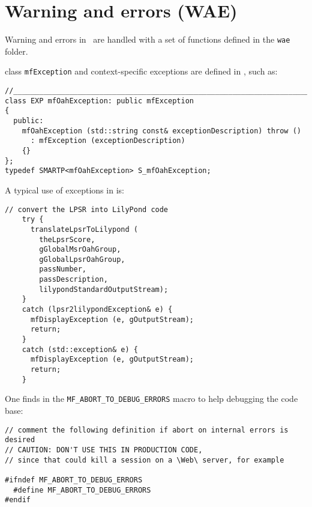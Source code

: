 
\chapter{Warning and errors (WAE)}


Warning and errors in \mf\ are handled with a set of functions defined in the {\tt wae} folder.

class   {\tt mfException} and context-specific exceptions are defined in , such as:
\begin{lstlisting}[language=CPlusPlus]
//______________________________________________________________________________
class EXP mfOahException: public mfException
{
  public:
    mfOahException (std::string const& exceptionDescription) throw ()
      : mfException (exceptionDescription)
    {}
};
typedef SMARTP<mfOahException> S_mfOahException;
\end{lstlisting}

A typical use of exceptions in  is:
\begin{lstlisting}[language=CPlusPlus]
    // convert the LPSR into LilyPond code
    try {
      translateLpsrToLilypond (
        theLpsrScore,
        gGlobalMsrOahGroup,
        gGlobalLpsrOahGroup,
        passNumber,
        passDescription,
        lilypondStandardOutputStream);
    }
    catch (lpsr2lilypondException& e) {
      mfDisplayException (e, gOutputStream);
      return;
    }
    catch (std::exception& e) {
      mfDisplayException (e, gOutputStream);
      return;
    }
\end{lstlisting}


One finds in  the {\tt MF_ABORT_TO_DEBUG_ERRORS} macro to help debugging the code base:
\begin{lstlisting}[language=CPlusPlus]
// comment the following definition if abort on internal errors is desired
// CAUTION: DON'T USE THIS IN PRODUCTION CODE,
// since that could kill a session on a \Web\ server, for example

#ifndef MF_ABORT_TO_DEBUG_ERRORS
  #define MF_ABORT_TO_DEBUG_ERRORS
#endif
\end{lstlisting}
